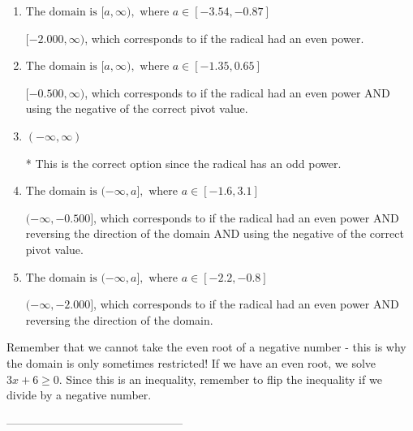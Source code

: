 \documentclass{article}[14pt]
\begin{document}
\begin{enumerate}[label=\Alph*.] 
\item $ \text{The domain is } [a, \infty), \text{   where } a \in [-3.54, -0.87] $ 

 $[-2.000, \infty)$, which corresponds to if the radical had an even power. 
\item $ \text{The domain is } [a, \infty), \text{   where } a \in [-1.35, 0.65] $ 

 $[-0.500, \infty)$, which corresponds to if the radical had an even power AND using the negative of the correct pivot value. 
\item $ (-\infty, \infty) $ 

 * This is the correct option since the radical has an odd power. 
\item $ \text{The domain is } (-\infty, a], \text{   where } a \in [-1.6, 3.1] $ 

 $(-\infty, -0.500]$, which corresponds to if the radical had an even power AND reversing the direction of the domain AND using the negative of the correct pivot value. 
\item $ \text{The domain is } (-\infty, a], \text{   where } a \in [-2.2, -0.8] $ 

 $(-\infty, -2.000]$, which corresponds to if the radical had an even power AND reversing the direction of the domain. 
\end{enumerate} 
 
Remember that we cannot take the even root of a negative number - this is why the domain is only sometimes restricted! If we have an even root, we solve $3 x + 6 \geq 0$. Since this is an inequality, remember to flip the inequality if we divide by a negative number.

-----------------------------------------------
\end{document}

